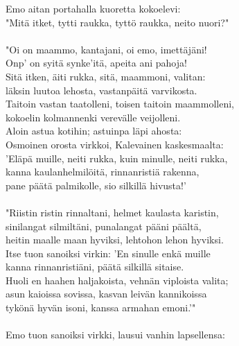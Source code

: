 Emo aitan portahalla kuoretta kokoelevi:                       \\
"Mitä itket, tytti raukka, tyttö raukka, neito nuori?"         \\
                                                               \\
"Oi on maammo, kantajani, oi emo, imettäjäni!                  \\
Onp' on syitä synke'itä, apeita ani pahoja!                    \\
Sitä itken, äiti rukka, sitä, maammoni, valitan:               \\
läksin luutoa lehosta, vastanpäitä varvikosta.                 \\
Taitoin vastan taatolleni, toisen taitoin maammolleni,         \\
kokoelin kolmannenki verevälle veijolleni.                     \\
Aloin astua kotihin; astuinpa läpi ahosta:                     \\
Osmoinen orosta virkkoi, Kalevainen kaskesmaalta:              \\
'Eläpä muille, neiti rukka, kuin minulle, neiti rukka,         \\
kanna kaulanhelmilöitä, rinnanristiä rakenna,                  \\
pane päätä palmikolle, sio silkillä hivusta!'                  \\
                                                               \\
"Riistin ristin rinnaltani, helmet kaulasta karistin,          \\
sinilangat silmiltäni, punalangat pääni päältä,                \\
heitin maalle maan hyviksi, lehtohon lehon hyviksi.            \\
Itse tuon sanoiksi virkin: 'En sinulle enkä muille             \\
kanna rinnanristiäni, päätä silkillä sitaise.                  \\
Huoli en haahen haljakoista, vehnän viploista valita;          \\
asun kaioissa sovissa, kasvan leivän kannikoissa               \\
tykönä hyvän isoni, kanssa armahan emoni.'"                    \\
                                                               \\
Emo tuon sanoiksi virkki, lausui vanhin lapsellensa:           \\
